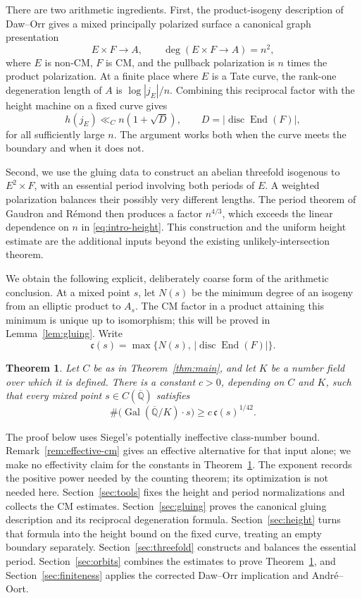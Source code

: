 \documentclass[11pt,a4paper]{article}
\numberwithin{equation}{section}
\newtheorem{theorem}{Theorem}[section]
\theoremstyle{definition}
\theoremstyle{remark}
\newcommand{\Qbar}{\overline{\mathbb Q}}
\newcommand{\End}{\operatorname{End}}
\newcommand{\disc}{\operatorname{disc}}
\newcommand{\Gal}{\operatorname{Gal}}
\newcommand{\cplx}{\mathfrak c}
\newcommand{\abs}[1]{\left|#1\right|}
\begin{document}
There are two arithmetic ingredients. First, the product-isogeny
description of Daw--Orr \cite[Lemmas~2.1 and~3.2]{DO} gives a mixed
principally polarized surface a canonical graph presentation
\[
 E\times F\longrightarrow A,\qquad \deg(E\times F\longrightarrow A)=n^2,
\]
where \(E\) is non-CM, \(F\) is CM, and the pullback polarization is
\(n\) times the product polarization. At a finite place where \(E\) is
a Tate curve, the rank-one degeneration length of \(A\) is
\(\log|j_E|/n\). Combining this reciprocal factor with the height
machine on a fixed curve gives
\begin{equation}\label{eq:intro-height}
 h(j_E)\ll_C n(1+\sqrt D),
 \qquad D=\abs{\disc\End(F)},
\end{equation}
for all sufficiently large \(n\). The argument works both when the
curve meets the boundary and when it does not.

Second, we use the gluing data to construct an abelian threefold
isogenous to \(E^2\times F\), with an essential period involving both
periods of \(E\). A weighted polarization balances their possibly very
different lengths. The period theorem of Gaudron and R\'emond then
produces a factor \(n^{4/3}\), which exceeds the linear dependence on
\(n\) in \eqref{eq:intro-height}. This construction and the uniform
height estimate are the additional inputs beyond the existing
unlikely-intersection theorem.

We obtain the following explicit, deliberately coarse form of the
arithmetic conclusion. At a mixed point \(s\), let \(N(s)\) be the
minimum degree of an isogeny from an elliptic product to \(A_s\).
The CM factor in a product attaining this minimum is unique up to
isomorphism; this will be proved in Lemma~\ref{lem:gluing}. Write
\[
 \cplx(s)=\max\{N(s),\,|\disc\End(F)|\}.
\]

\begin{theorem}\label{thm:orbits}
Let \(C\) be as in Theorem~\ref{thm:main}, and let \(K\) be a number
field over which it is defined. There is a constant \(c>0\), depending
on \(C\) and \(K\), such that every mixed point \(s\in C(\Qbar)\)
satisfies
\[
 \#\bigl(\Gal(\Qbar/K)\cdot s\bigr)
 \ge c\,\cplx(s)^{1/42}.
\]
\end{theorem}

The proof below uses Siegel's potentially ineffective class-number
bound. Remark~\ref{rem:effective-cm} gives an effective alternative for
that input alone; we make no effectivity claim for the constants in
Theorem~\ref{thm:orbits}. The exponent records the positive power needed
by the counting theorem; its optimization is not needed here.
Section~\ref{sec:tools} fixes the height and period normalizations and
collects the CM estimates. Section~\ref{sec:gluing} proves the canonical
gluing description and its reciprocal degeneration formula.
Section~\ref{sec:height} turns that formula into the height bound on
the fixed curve, treating an empty boundary separately.
Section~\ref{sec:threefold} constructs and balances the essential
period. Section~\ref{sec:orbits} combines the estimates to prove
Theorem~\ref{thm:orbits}, and Section~\ref{sec:finiteness} applies
the corrected Daw--Orr implication and Andr\'e--Oort.
\end{document}
